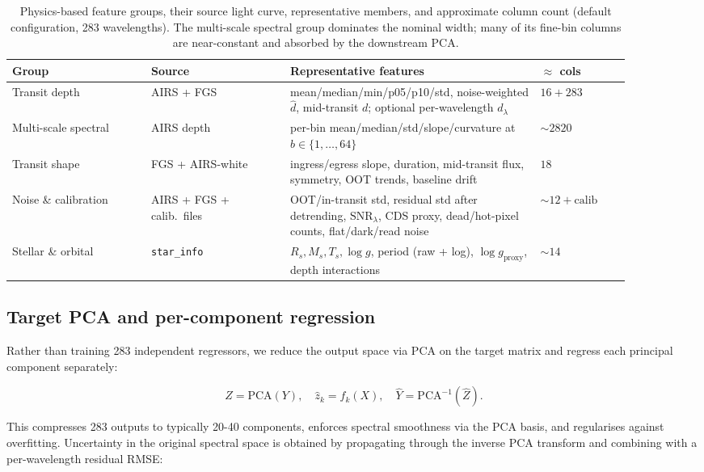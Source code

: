 \documentclass[12pt]{article}
\begin{document}
\begin{table}[H]
\centering\small
\caption{Physics-based feature groups, their source light curve, representative members, and approximate column count (default configuration, 283 wavelengths). The multi-scale spectral group dominates the nominal width; many of its fine-bin columns are near-constant and absorbed by the downstream PCA.}
\label{tab:features}
\begin{tabular}{@{}p{0.20\linewidth} p{0.20\linewidth} p{0.36\linewidth} p{0.13\linewidth}@{}}
\toprule
\textbf{Group} & \textbf{Source} & \textbf{Representative features} & \textbf{$\approx$ cols} \\
\midrule
Transit depth & AIRS + FGS & mean/median/min/p05/p10/std, noise-weighted $\hat d$, mid-transit $d$; optional per-wavelength $d_\lambda$ & $16+283$ \\
Multi-scale spectral & AIRS depth & per-bin mean/median/std/slope/curvature at $b\in\{1,\dots,64\}$ & ${\sim}2820$ \\
Transit shape & FGS + AIRS-white & ingress/egress slope, duration, mid-transit flux, symmetry, OOT trends, baseline drift & $18$ \\
Noise \& calibration & AIRS + FGS + calib.\ files & OOT/in-transit std, residual std after detrending, $\mathrm{SNR}_\lambda$, CDS proxy, dead/hot-pixel counts, flat/dark/read noise & ${\sim}12+\text{calib}$ \\
Stellar \& orbital & \texttt{star\_info} & $R_s,M_s,T_s,\log g$, period (raw + log), $\log g_{\text{proxy}}$, depth interactions & ${\sim}14$ \\
\bottomrule
\end{tabular}
\end{table}

\subsection{Target PCA and per-component regression}
\label{sec:targetpca}

Rather than training 283 independent regressors, we reduce the output space via PCA on the target matrix and regress each principal component separately:

\[
Z = \mathrm{PCA}(Y),\quad \hat{z}_k = f_k(X),\quad \hat{Y} = \mathrm{PCA}^{-1}(\hat{Z}).
\]

This compresses 283 outputs to typically 20-40 components, enforces spectral smoothness via the PCA basis, and regularises against overfitting. Uncertainty in the original spectral space is obtained by propagating through the inverse PCA transform and combining with a per-wavelength residual RMSE:
\end{document}
